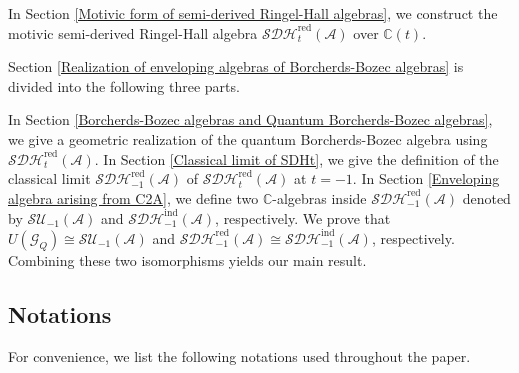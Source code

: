 \documentclass[12pt]{amsart}
\theoremstyle{definition}
\numberwithin{equation}{section}
\begin{document}
In Section \ref{Motivic form of semi-derived Ringel-Hall algebras}, we construct the motivic semi-derived Ringel-Hall algebra $ \mathcal{SDH}_t^{\mathrm{red}}(\mathcal{A}) $ over $ \mathbb{C}(t) $.

Section \ref{Realization of enveloping algebras of Borcherds-Bozec algebras} is divided into the following three parts. 

In Section \ref{Borcherds-Bozec algebras and Quantum Borcherds-Bozec algebras}, we give a geometric realization of the quantum Borcherds-Bozec algebra using $ \mathcal{SDH}_t^{\mathrm{red}}(\mathcal{A}) $. 
In Section \ref{Classical limit of SDHt}, we give the definition of the classical limit $ \mathcal{SDH}_{-1}^{\mathrm{red}}(\mathcal{A}) $ of  $ \mathcal{SDH}_t^{\mathrm{red}}(\mathcal{A}) $ at $ t=-1 $. 
In Section \ref{Enveloping algebra arising from C2A}, we define two $ \mathbb{C} $-algebras inside $ \mathcal{SDH}_{-1}^{\mathrm{red}}(\mathcal{A}) $ denoted by $ \mathcal{SU}_{-1}(\mathcal{A}) $ and $ \mathcal{SDH}_{-1}^{\mathrm{ind}}(\mathcal{A}) $, respectively.  
We prove that $ U(\mathcal{G}_Q) \cong \mathcal{SU}_{-1}(\mathcal{A})$ and $ \mathcal{SDH}_{-1}^{\mathrm{red}}(\mathcal{A}) \cong \mathcal{SDH}_{-1}^{\mathrm{ind}}(\mathcal{A}) $, respectively. 
Combining these two isomorphisms yields our main result.

\subsection{Notations}\;

For convenience, we list the following notations used throughout the paper. 
\end{document}

